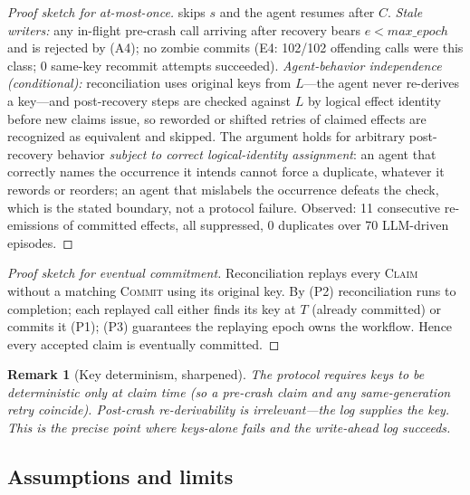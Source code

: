\documentclass[10pt,journal,compsoc]{IEEEtran}
\newtheorem{remark}{Remark}
\begin{document}
\begin{proof}[Proof sketch for at-most-once]
skips $s$ and the agent resumes after $C$. \emph{Stale writers:}
any in-flight pre-crash call arriving after recovery bears
$e < \mathit{max\_epoch}$ and is rejected by (A4); no zombie
commits (E4: 102/102 offending calls were this class; 0
same-key recommit attempts succeeded).
\emph{Agent-behavior independence (conditional):} reconciliation uses original
keys from $L$---the agent never re-derives a key---and
post-recovery steps are checked against $L$ by logical effect
identity before new claims issue, so reworded or shifted
retries of claimed effects are recognized as equivalent and
skipped. The argument holds for arbitrary post-recovery
behavior \emph{subject to correct logical-identity
assignment}: an agent that correctly names the occurrence it
intends cannot force a duplicate, whatever it rewords or
reorders; an agent that mislabels the occurrence defeats the
check, which is the stated boundary, not a protocol failure.
Observed: 11 consecutive re-emissions of committed effects,
all suppressed, 0 duplicates over 70 LLM-driven episodes.
\end{proof}

\begin{proof}[Proof sketch for eventual commitment]
Reconciliation replays every \textsc{Claim} without a matching
\textsc{Commit} using its original key. By (P2) reconciliation
runs to completion; each replayed call either finds its key at
$T$ (already committed) or commits it (P1); (P3) guarantees the
replaying epoch owns the workflow. Hence every accepted claim
is eventually committed.
\end{proof}

\begin{remark}[Key determinism, sharpened]
The protocol requires keys to be deterministic only \emph{at
claim time} (so a pre-crash claim and any same-generation retry
coincide). Post-crash \emph{re-derivability} is irrelevant---the
log supplies the key. This is the precise point where keys-alone
fails and the write-ahead log succeeds.
\end{remark}

\subsection{Assumptions and limits}
\end{document}
